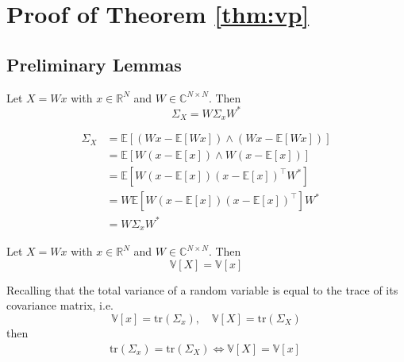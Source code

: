 \section{Proof of Theorem \ref{thm:vp}}
%
\subsection{Preliminary Lemmas}
%
\begin{lemma} \label{lem:A1}
    Let $X = Wx$ with $x\in\mathbb R^N$ and $W\in\mathbb C^{N\times N}$. Then
    \[
        \Sigma_X = W \Sigma_x W^*
    \]
\end{lemma}
%
\proof
    \[
        \begin{aligned}
            \Sigma_X &= \mathbb E\left[ (Wx - \mathbb{E}[Wx])\wedge (Wx - \mathbb{E}[Wx])\right]\\
                     &= \mathbb E\left[ W(x - \mathbb{E}[x])\wedge W(x - \mathbb{E}[x])\right]\\
                     &= \mathbb E\left[ W(x - \mathbb{E}[x])(x - \mathbb{E}[x])^\top W^*\right]\\
                     &= W\mathbb E\left[ W(x - \mathbb{E}[x])(x - \mathbb{E}[x])^\top \right]W^*\\
                     &= W \Sigma_x W^*
        \end{aligned}
    \]
%
\endproof
%
\begin{lemma} \label{lem:A2} Let $X = Wx$ with $x\in\mathbb R^N$ and $W\in\mathbb C^{N\times N}$. Then
$$
    \mathbb V[X] = \mathbb{V}[x]
$$
\end{lemma}
%
\proof
    Recalling that the total variance of a random variable is equal to the trace of its covariance matrix, i.e. 
    \[
        \mathbb{V}[x] = \text{tr}(\Sigma_x),\quad\mathbb{V}[X] = \text{tr}(\Sigma_X)
    \]
    then
    \[
        \begin{aligned}
                            \text{tr}(\Sigma_x) =  \text{tr}(\Sigma_X) \Leftrightarrow  \mathbb V[X] = \mathbb{V}[x]
\        \end{aligned}
    \]
    
